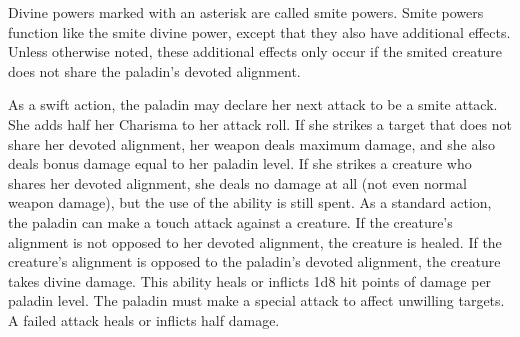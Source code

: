Divine powers marked with an asterisk are called smite powers. Smite powers function like the smite divine power, except that they also have additional effects. Unless otherwise noted, these additional effects only occur if the smited creature does not share the paladin's devoted alignment.


 As a swift action, the paladin may declare her next attack to be a smite attack. She adds half her Charisma to her attack roll. If she strikes a target that does not share her devoted alignment, her weapon deals maximum damage, and she also deals bonus damage equal to her paladin level. If she strikes a creature who shares her devoted alignment, she deals no damage at all (not even normal weapon damage), but the use of the ability is still spent.
 As a standard action, the paladin can make a touch attack against a creature. If the creature's alignment is not opposed to her devoted alignment, the creature is healed. If the creature's alignment is opposed to the paladin's devoted alignment, the creature takes divine damage. This ability heals or inflicts 1d8 hit points of damage per paladin level. The paladin must make a special attack to affect unwilling targets. A failed attack heals or inflicts half damage.

